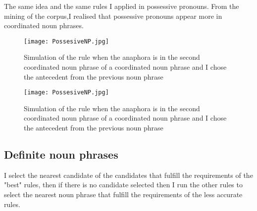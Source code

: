 The same idea and the same rules I applied in possessive pronouns. From the mining of the corpus,I realised that possessive pronouns appear more in coordinated noun phrases. 
\newpage
\begin{figure}[h]
  \begin{center}
	\texttt{[image: PossesiveNP.jpg]} 
 	\caption[Simulation of  a rules in possessive pronouns]{Simulation of  the rule when the anaphora  is in the second coordinated noun phrase of a coordinated noun phrase and I chose the antecedent from the previous noun phrase\footnotemark}
	\label{Figure 14}
  \end{center}
 \end{figure}
 
\newpage

\begin{figure}[h]
  \begin{center}
	\texttt{[image: PossesiveNP.jpg]} 
 	\caption[Simulation of  a rules in possessive pronouns]{Simulation of  the rule when the anaphora  is in the second coordinated noun phrase of a coordinated noun phrase and I chose the antecedent from the previous noun phrase\footnotemark}
	\label{Figure 15}
  \end{center}
\end{figure}


\subsection{Definite noun phrases} 

I select the nearest candidate of the candidates that fulfill the requirements of the "best" rules, then if there is no candidate selected then I run the other rules to select the nearest noun phrase that fulfill the requirements of the less accurate rules.  
